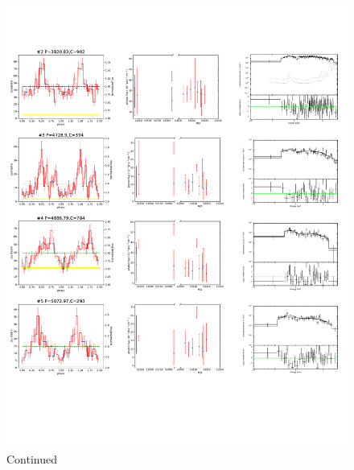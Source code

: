 \documentclass[fleqn,usenatbib]{mnras}
\begin{document}
  \begin{figure}
    \centering
    \includegraphics[page=6,scale=0.90,trim=0 100 0 20,clip]{plot_figure_LW.pdf}
    \caption{Continued}
  \end{figure}
  

\end{document}
